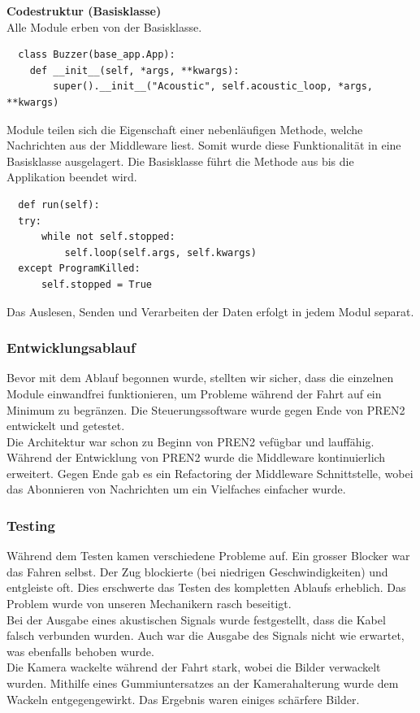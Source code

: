 \documentclass[../../main.tex]{subfiles}
\begin{document}
\pagebreak

\textbf{Codestruktur (Basisklasse)} \\
Alle Module erben von der Basisklasse.\\
\begin{lstlisting}
  class Buzzer(base_app.App):
    def __init__(self, *args, **kwargs):
        super().__init__("Acoustic", self.acoustic_loop, *args, **kwargs)
\end{lstlisting}
Module teilen sich die Eigenschaft einer nebenläufigen Methode, welche Nachrichten aus der Middleware liest. Somit wurde diese Funktionalität in eine Basisklasse ausgelagert. Die Basisklasse führt die Methode aus bis die Applikation beendet wird.\\
\begin{lstlisting}
  def run(self):
  try:
      while not self.stopped:
          self.loop(self.args, self.kwargs)
  except ProgramKilled:
      self.stopped = True
\end{lstlisting}
Das Auslesen, Senden und Verarbeiten der Daten erfolgt in jedem Modul separat.

\subsubsection{Entwicklungsablauf}
Bevor mit dem Ablauf begonnen wurde, stellten wir sicher, dass die einzelnen Module einwandfrei funktionieren, um Probleme während der Fahrt auf ein Minimum zu begränzen. Die Steuerungssoftware wurde gegen Ende von PREN2 entwickelt und getestet. \\

Die Architektur war schon zu Beginn von PREN2 vefügbar und lauffähig. Während der Entwicklung von PREN2 wurde die Middleware kontinuierlich erweitert. Gegen Ende gab es ein Refactoring der Middleware Schnittstelle, wobei das Abonnieren von Nachrichten um ein Vielfaches einfacher wurde.

\subsubsection{Testing}
Während dem Testen kamen verschiedene Probleme auf. Ein grosser Blocker war das Fahren selbst. Der Zug blockierte (bei niedrigen Geschwindigkeiten) und entgleiste oft. Dies erschwerte das Testen des kompletten Ablaufs erheblich. Das Problem wurde von unseren Mechanikern rasch beseitigt. \\

Bei der Ausgabe eines akustischen Signals wurde festgestellt, dass die Kabel falsch verbunden wurden. Auch war die Ausgabe des Signals nicht wie erwartet, was ebenfalls behoben wurde. \\

Die Kamera wackelte während der Fahrt stark, wobei die Bilder verwackelt wurden. Mithilfe eines Gummiuntersatzes an der Kamerahalterung wurde dem Wackeln entgegengewirkt. Das Ergebnis waren einiges schärfere Bilder.
\end{document}
